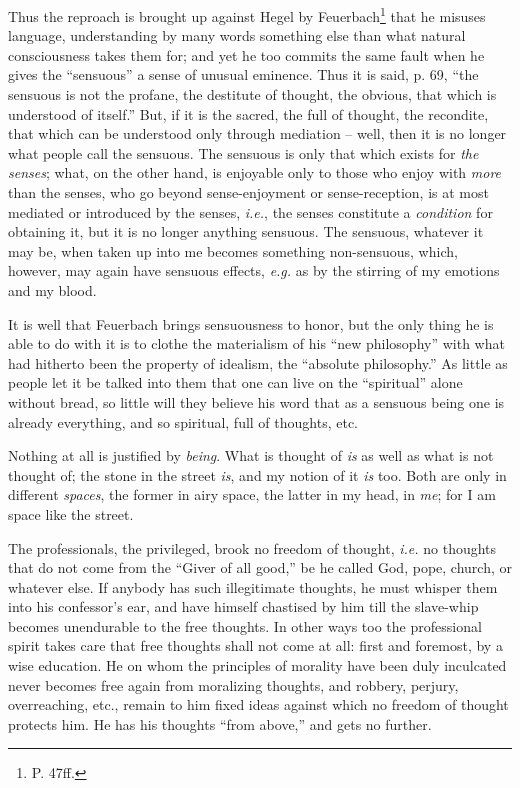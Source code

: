 \documentclass[12pt,a4paper]{book}
\begin{document}
Thus the reproach is brought up against Hegel by Feuerbach\footnote{P. 47ff.} 
that he misuses language, understanding by many words something else than what 
natural consciousness takes them for; and yet he too commits the same fault 
when he gives the ``sensuous'' a sense of unusual eminence. Thus it is said, 
p. 69, ``the sensuous is not the profane, the destitute of thought, the 
obvious, that which is understood of itself.'' But, if it is the sacred, the 
full of thought, the recondite, that which can be understood only through 
mediation -- well, then it is no longer what people call the sensuous. The 
sensuous is only that which exists for \textit{the senses}; what, on the other 
hand, is enjoyable only to those who enjoy with \textit{more} than the senses, 
who go beyond sense-enjoyment or sense-reception, is at most mediated or 
introduced by the senses, \textit{i.e.}, the senses constitute a 
\textit{condition} for obtaining it, but it is no longer anything sensuous. 
The sensuous, whatever it may be, when taken up into me becomes something 
non-sensuous, which, however, may again have sensuous effects, \textit{e.g.} 
as by the stirring of my emotions and my blood.

It is well that Feuerbach brings sensuousness to honor, but the only thing he 
is able to do with it is to clothe the materialism of his ``new philosophy'' 
with what had hitherto been the property of idealism, the ``absolute 
philosophy.'' As little as people let it be talked into them that one can 
live on the ``spiritual'' alone without bread, so little will they believe 
his word that as a sensuous being one is already everything, and so spiritual, 
full of thoughts, etc.

Nothing at all is justified by \textit{being}. What is thought of \textit{is} 
as well as what is not thought of; the stone in the street \textit{is}, and my 
notion of it \textit{is} too. Both are only in different \textit{spaces}, the 
former in airy space, the latter in my head, in \textit{me}; for I am space 
like the street.

The professionals, the privileged, brook no freedom of thought, \textit{i.e.} 
no thoughts that do not come from the ``Giver of all good,'' be he called 
God, pope, church, or whatever else. If anybody has such illegitimate 
thoughts, he must whisper them into his confessor's ear, and have himself 
chastised by him till the slave-whip becomes unendurable to the free thoughts. 
In other ways too the professional spirit takes care that free thoughts shall 
not come at all: first and foremost, by a wise education. He on whom the 
principles of morality have been duly inculcated never becomes free again from 
moralizing thoughts, and robbery, perjury, overreaching, etc., remain to him 
fixed ideas against which no freedom of thought protects him. He has his 
thoughts ``from above,'' and gets no further.
\end{document}
